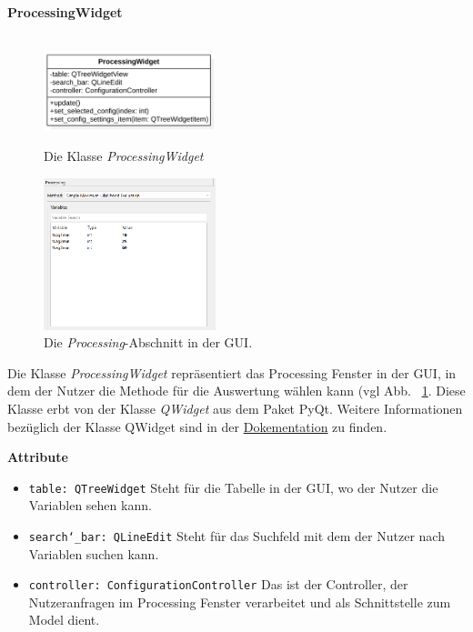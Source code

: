 \documentclass{article}
\begin{document}
\newpage
\textbf{\large{ProcessingWidget}}\\\\
\begin{figure}[H]%
    \centering
    \begin{minipage}[b]{0.4\textwidth}
        \includegraphics[width=5cm]{entwurf/Entwurf_dokument/img/klassenView/ProcessingWidget.png}
        \caption{Die Klasse \textit{ProcessingWidget}}
    \end{minipage}
    \hfill
    \begin{minipage}[b]{0.4\textwidth}
        \includegraphics[width=5cm]{entwurf/Entwurf_dokument/img/Alissa/Processing.png} 
    \caption{Die \textit{Processing}-Abschnitt in der GUI.}
    \label{fig: ProcessingWidgetGUI}
    \end{minipage}
\end{figure}
Die Klasse \textit{ProcessingWidget} repräsentiert das Processing Fenster in der GUI, in dem der Nutzer die Methode für die Auswertung wählen kann (vgl Abb. ~\ref{fig: ProcessingWidgetGUI}. Diese Klasse erbt von der Klasse \textit{QWidget} aus dem Paket PyQt. Weitere Informationen bezüglich der Klasse QWidget sind in der \href{https://doc.qt.io/qt-6/qwidget.html}{Dokementation} zu finden.
\newline \newline

\textbf{{Attribute}}
\begin{itemize}
\item \texttt{table: QTreeWidget} \newline Steht für die Tabelle in der GUI, wo der Nutzer die Variablen sehen kann.
\item \texttt{search\char`_bar: QLineEdit} \newline Steht für das Suchfeld mit dem der Nutzer nach Variablen suchen kann.
\item \texttt{controller: ConfigurationController} \newline Das ist der Controller, der Nutzeranfragen im Processing Fenster verarbeitet und als Schnittstelle zum Model dient.
\end{itemize}
\end{document}
